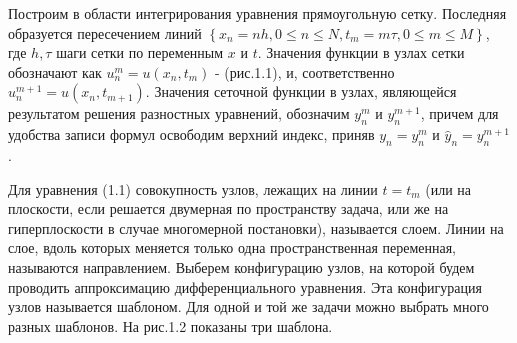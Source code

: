 \documentclass[a4paper,14pt]{article}
\begin{document}
Построим в области интегрирования уравнения прямоугольную сетку. Последняя
образуется пересечением линий $\left\{ x_n = nh, 0 \leq n \leq N, t_m = m\tau, 0 \leq m \leq M \right\}$,
где $h, \tau$ шаги сетки по переменным $x$ и $t$. Значения функции в узлах
сетки обозначают как $u_n^m = u(x_n, t_m)$ - (рис.1.1), и, соответственно
$u_n^{m+1} = u(x_n, t_{m+1})$. Значения сеточной функции в узлах, являющейся результатом решения разностных
уравнений, обозначим $y_n^m$ и $y_n^{m+1}$, причем для удобства записи формул освободим верхний
индекс, приняв $y_n = y_n^m$ и $\hat{y}_n = y_n^{m+1}$.

\begin{figure}[!h]
	\label{fig:t235}
\end{figure}
\newpage
Для уравнения (1.1) совокупность узлов, лежащих на линии $t=t_m$ (или на 
плоскости, если решается двумерная по пространству задача, или же на
гиперплоскости в случае многомерной постановки), называется слоем. Линии на слое,
вдоль которых меняется только одна пространственная переменная, называются
направлением. Выберем конфигурацию узлов, на которой будем проводить
аппроксимацию дифференциального уравнения. Эта конфигурация узлов называется
шаблоном. Для одной и той же задачи можно выбрать много разных шаблонов. На рис.1.2
показаны три шаблона.
\newpage
\end{document}

